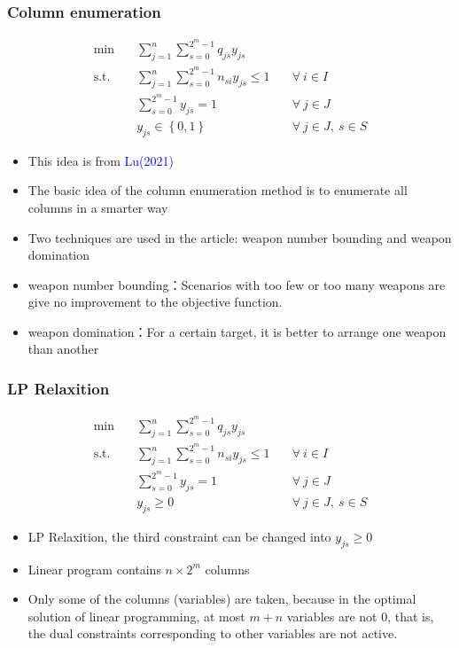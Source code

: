 \documentclass[CJK,10pt]{beamer}
\newcommand{\sumFromTo}[3]{\ensuremath{\sum_{#1}^{#2} #3}}
\newcommand{\optimalProblem}[3]
{\begin{align*}
    #1 \quad &#2 \\
    \mathrm{s. t.}\quad&#3
\end{align*}}
\begin{document}
\begin{frame}
    \frametitle{Column enumeration}
    \optimalProblem{\min}{\sumFromTo{j = 1}{n}{\sumFromTo{s = 0}{2^m -1}{q_{js}y_{js}}}\tag{CG}}{\sumFromTo{j = 1}{n}{\sumFromTo{s = 0}{2^m -1}{n_{si}y_{js}}}\leq 1 \quad &\forall ~ i \in I\\& \sumFromTo{s = 0}{2^m - 1}{y_{js}} = 1 \quad &\forall ~ j \in J\\& y_{js} \in \left\{ 0,1 \right\} & \forall ~ j\in J,\ s\in S}

    \begin{itemize}
        \item This idea is from \textcolor{blue}{Lu(2021)}
        \item The basic idea of the column enumeration method is to enumerate all columns in a smarter way
        \item Two techniques are used in the article: weapon number bounding and weapon domination
        \item weapon number bounding：Scenarios with too few or too many weapons are give no improvement to the objective function.
        \item weapon domination：For a certain target, it is better to arrange one weapon than another
    \end{itemize}
\end{frame}




\begin{frame}
    \frametitle{LP Relaxition}
    \optimalProblem{\min}{\sumFromTo{j = 1}{n}{\sumFromTo{s = 0}{2^m -1}{q_{js}y_{js}}}\tag{CG-LP}}{\sumFromTo{j = 1}{n}{\sumFromTo{s = 0}{2^m -1}{n_{si}y_{js}}}\leq 1 \quad &\forall ~ i \in I\\& \sumFromTo{s = 0}{2^m - 1}{y_{js}} = 1 \quad &\forall ~  j \in J\\& y_{js} \geq 0 &\forall ~ j\in J,\ s\in S}
    \begin{itemize}
        \item LP Relaxition, the third constraint can be changed into $y_{js} \geq 0$
        \item Linear program contains $n \times 2^m$ columns
        \item Only some of the columns (variables) are taken, because in the optimal solution of linear programming, at most $m+n$ variables are not 0, that is, the dual constraints corresponding to other variables are not active.
    \end{itemize}
\end{frame}
\end{document}
